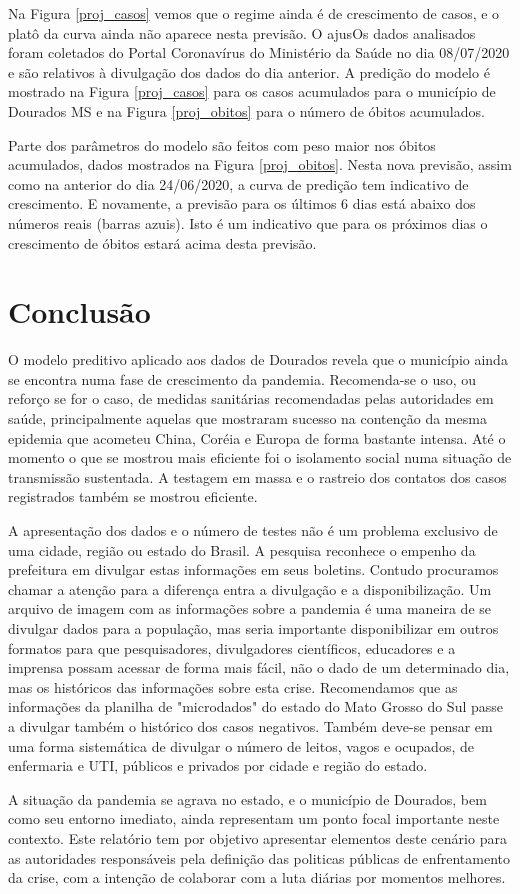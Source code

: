 \documentclass[12pt]{article}
\begin{document}
Na Figura \ref{proj_casos} vemos que o regime ainda é de crescimento de casos, e o platô da curva ainda não aparece nesta previsão. O ajusOs dados analisados foram coletados do Portal Coronavírus do Ministério da Saúde \cite{minsaude} no dia 08/07/2020 e são relativos à divulgação dos dados do dia anterior. A predição do modelo é mostrado na Figura \ref{proj_casos} para os casos acumulados para o município de Dourados MS e na Figura \ref{proj_obitos} para o número de óbitos acumulados.

Parte dos parâmetros do modelo são feitos com peso maior nos óbitos acumulados, dados mostrados na Figura \ref{proj_obitos}. Nesta nova previsão, assim como na anterior do dia 24/06/2020, a curva de predição tem indicativo de crescimento. E novamente, a previsão para os últimos 6 dias está abaixo dos números reais (barras azuis). Isto é um indicativo que para os próximos dias o crescimento de óbitos estará acima desta previsão.   

\section{Conclusão}\label{conc}

O modelo preditivo aplicado aos dados de Dourados revela que o município ainda se encontra numa fase de crescimento da pandemia. Recomenda-se o uso, ou reforço se for o caso, de medidas sanitárias recomendadas pelas autoridades em saúde, principalmente aquelas que mostraram sucesso na contenção da mesma epidemia que acometeu China, Coréia e Europa de forma bastante intensa. Até o momento o que se mostrou mais eficiente foi o isolamento social numa situação de transmissão sustentada. A testagem em massa e o rastreio dos contatos dos casos registrados também se mostrou eficiente.

A apresentação dos dados e o número de testes não é um problema exclusivo de uma cidade, região ou estado do Brasil. A pesquisa reconhece o empenho da prefeitura em divulgar estas informações em seus boletins. Contudo procuramos chamar a atenção para a diferença entra a divulgação e a disponibilização. Um arquivo de imagem com as informações sobre a pandemia é uma maneira de se divulgar dados para a população, mas seria importante disponibilizar em outros formatos para que pesquisadores, divulgadores científicos, educadores e a imprensa possam acessar de forma mais fácil, não o dado de um determinado dia, mas os históricos das informações sobre esta crise. Recomendamos que as informações da planilha de "microdados" do estado do Mato Grosso do Sul passe a divulgar também o histórico dos casos negativos. Também deve-se pensar em uma forma sistemática de divulgar o número de leitos, vagos e ocupados, de enfermaria e UTI, públicos e privados por cidade e região do estado.


A situação da pandemia se agrava no estado, e o município de Dourados, bem como seu entorno imediato, ainda representam um ponto focal importante neste contexto. Este relatório tem por objetivo apresentar elementos deste cenário para as autoridades responsáveis pela definição das politicas públicas de enfrentamento da crise, com a intenção de colaborar com a luta diárias por momentos melhores.



\end{document}
